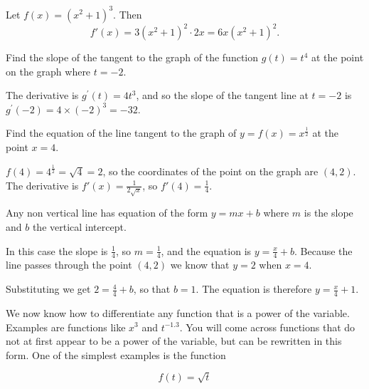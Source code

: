 \begin{example}

Let $f(x)=(x^2+1)^3$. Then
\[
f'(x) = 3(x^2+1)^2\cdot 2x = 6x(x^2+1)^2.
\]
\end{example}

\begin{example}

Find the slope of the tangent to the graph of the function $g(t)=t^{4}$ at the point on the graph where $t=-2$.


\begin{solution}
    
The derivative is $g^{\prime}(t)=4 t^{3}$, and so the slope of the tangent line at $t=-2$ is $g^{\prime}(-2)= 4 \times(-2)^{3}=-32$.
\end{solution}

\end{example}



\begin{example}

Find the equation of the line tangent to the graph of $y=f(x)=x^{\frac{1}{2}}$ at the point $x=4$.



\begin{solution}

$f(4)=4^{\frac{1}{2}}=\sqrt{4}=2$, so the coordinates of the point on the graph are $(4,2)$. The derivative is $f'(x)=\frac{1}{2\sqrt{x}}$, so $f'(4)=\frac{1}{4}$.

Any non vertical line has equation of the form $y=m x+b$ where $m$ is the slope and $b$ the vertical intercept.

In this case the slope is $\frac{1}{4}$, so $m=\frac{1}{4}$, and the equation is $y=\frac{x}{4}+b$. Because the line passes through the point $(4,2)$ we know that $y=2$ when $x=4$.

Substituting we get $2=\frac{4}{4}+b$, so that $b=1$. The equation is therefore $y=\frac{x}{4}+1$. \end{solution}

\end{example}

We now know how to differentiate any function that is a power of the variable. Examples are functions like $x^{3}$ and $t^{-1.3}$. You will come across functions that do not at first appear to be a power of the variable, but can be rewritten in this form. One of the simplest examples is the function

\[
    f(t)=\sqrt{t}
\]


